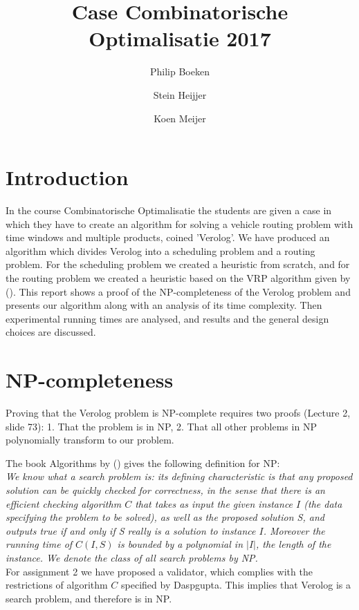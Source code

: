 \documentclass[a4paper]{article}
\title{Case Combinatorische Optimalisatie 2017}
\author{Philip Boeken \and Stein Heijjer \and Koen Meijer}
\begin{document}
\maketitle
\section{Introduction}
In the course Combinatorische Optimalisatie the students are given a case in which they have to create an algorithm for solving a vehicle routing problem with time windows and multiple products, coined 'Verolog'. We have produced an algorithm which divides Verolog into a scheduling problem and a routing problem. For the scheduling problem we created a heuristic from scratch, and for the routing problem we created a heuristic based on the VRP algorithm given by \citeauthor{clarkewright1964} (\citeyear{clarkewright1964}). This report shows a proof of the NP-completeness of the Verolog problem and presents our algorithm along with an analysis of its time complexity. Then experimental running times are analysed, and results and the general design choices are discussed.  

\section{NP-completeness}
Proving that the Verolog problem is NP-complete requires two proofs (Lecture 2, slide 73): 1. That the problem is in NP, 2. That all other problems in NP polynomially transform to our problem.

The book Algorithms by \citeauthor{Dasgupta2006} (\citeyear{Dasgupta2006}) gives the following definition for NP: \\

\emph{We know what a search problem is: its defining characteristic is that any proposed solution can be quickly checked for correctness, in the sense that there is an efficient checking algorithm $C$ that takes as input the given instance $I$ (the data specifying the problem to be solved), as well as the proposed solution S, and outputs true if and only if S really is a solution to instance $I$. Moreover the running time of $C(I,S)$ is bounded by a polynomial in $|I|$, the length of the instance. We denote the class of all search problems by NP.} \\

For assignment 2 we have proposed a validator, which complies with the restrictions of algorithm $C$ specified by Daspgupta. This implies that Verolog is a search problem, and therefore is in NP.
\end{document}
